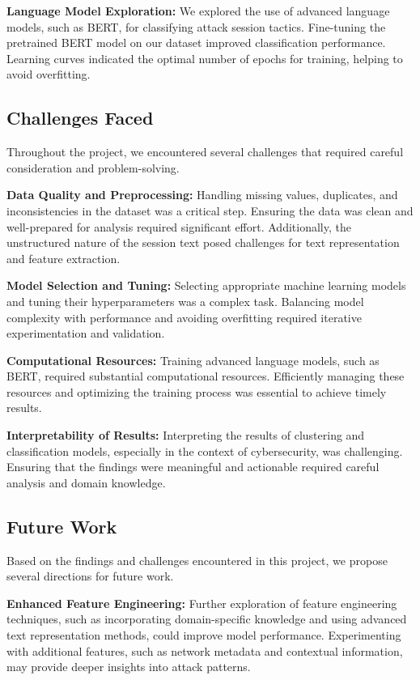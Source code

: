         \textbf{Language Model Exploration:} We explored the use of advanced language models, such as BERT, for classifying attack session tactics. Fine-tuning the pretrained BERT model on our dataset improved classification performance. Learning curves indicated the optimal number of epochs for training, helping to avoid overfitting.

    \subsection{Challenges Faced}
    
        Throughout the project, we encountered several challenges that required careful consideration and problem-solving.

        \textbf{Data Quality and Preprocessing:} Handling missing values, duplicates, and inconsistencies in the dataset was a critical step. Ensuring the data was clean and well-prepared for analysis required significant effort. Additionally, the unstructured nature of the session text posed challenges for text representation and feature extraction.

        \textbf{Model Selection and Tuning:} Selecting appropriate machine learning models and tuning their hyperparameters was a complex task. Balancing model complexity with performance and avoiding overfitting required iterative experimentation and validation.

        \textbf{Computational Resources:} Training advanced language models, such as BERT, required substantial computational resources. Efficiently managing these resources and optimizing the training process was essential to achieve timely results.

        \textbf{Interpretability of Results:} Interpreting the results of clustering and classification models, especially in the context of cybersecurity, was challenging. Ensuring that the findings were meaningful and actionable required careful analysis and domain knowledge.

    \subsection{Future Work}
    
        Based on the findings and challenges encountered in this project, we propose several directions for future work.

        \textbf{Enhanced Feature Engineering:} Further exploration of feature engineering techniques, such as incorporating domain-specific knowledge and using advanced text representation methods, could improve model performance. Experimenting with additional features, such as network metadata and contextual information, may provide deeper insights into attack patterns.

